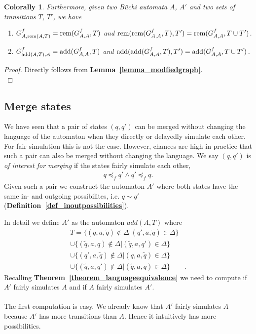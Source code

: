 \documentclass[12pt,oneside,bibliography=totoc,abstracton]{scrartcl}
\newcommand{\lemmaref}[1]{\textbf{Lemma~\ref{#1}}}
\newcommand{\theoremref}[1]{\textbf{Theorem~\ref{#1}}}
\newcommand{\defref}[1]{\textbf{Definition~\ref{#1}}}
\newtheorem{mycorollary}{Colorally}
\begin{document}
\begin{mycorollary}
	Furthermore, given two Büchi automata $A$, $A'$ and two sets of transitions $T$, $T'$, we have
	\begin{enumerate}
		\item $G^f_{A, \textnormal{rem}(A, T)} = \textnormal{rem}(G^f_{A, A}, T)$ and
			\subitem $\textnormal{rem}(\textnormal{rem}(G^f_{A, A}, T), T') = \textnormal{rem}(G^f_{A, A}, T \cup T')$.
		\item $G^f_{\textnormal{add}(A, T), A} = \textnormal{add}(G^f_{A, A}, T)$ and
			\subitem $\textnormal{add}(\textnormal{add}(G^f_{A, A}, T), T') = \textnormal{add}(G^f_{A, A}, T \cup T')$.
	\end{enumerate}
\end{mycorollary}
\begin{proof}
	Directly follows from \lemmaref{lemma_modfiedgraph}.\\
\end{proof}

\subsection{Merge states}\label{section_mergestates}
We have seen that a pair of states $(q, q')$ can be merged without changing the language
of the automaton when they directly or delayedly simulate each other. For fair simulation this is not the case.
However, chances are high in practice that such a pair can also be merged without changing the language.
We say $(q, q')$ is \textit{of interest for merging} if the states fairly simulate each other,
\begin{align*}
	q \preceq_f q' \land q' \preceq_f q.
\end{align*}
Given such a pair we construct the automaton $A'$ where both states have the same
in- and outgoing possibilites, i.e. $q \sim q'$ (\defref{def_inoutpossibilities}).

In detail we define $A'$ as the automaton $add(A, T)$ where
\begin{align*}
	T = \{(q, a, \tilde{q}) \notin \Delta | (q', a, \tilde{q}) \in \Delta\}\\
		\cup \{(\tilde{q}, a, q) \notin \Delta | (\tilde{q}, a, q') \in \Delta\}\\
		\cup \{(q', a, \tilde{q}) \notin \Delta | (q, a, \tilde{q}) \in \Delta\}\\
		\cup \{(\tilde{q}, a, q') \notin \Delta | (\tilde{q}, a, q) \in \Delta\}	&.
\end{align*}
Recalling \theoremref{theorem_languageequivalence} we need to compute if $A'$ fairly simulates $A$ and if $A$ fairly simulates $A'$.\\\\
The first computation is easy. We already know that $A'$ fairly simulates $A$ because $A'$ has more transitions than $A$.
Hence it intuitively has more possibilities.
\end{document}
